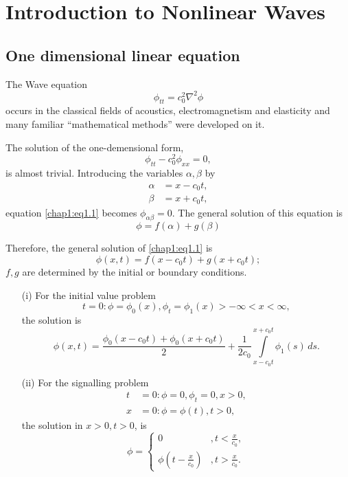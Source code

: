 
\chapter{Introduction to Nonlinear Waves}\label{chap1}

\section{One dimensional linear equation}\pageoriginale\label{chap1:sec1.1}

The Wave equation
$$
\phi_{tt}=c_0^2 \nabla^2\phi
$$
occurs in the classical fields of acoustics, electromagnetism and elasticity and many familiar ``mathematical methods'' were developed on it. 

The solution of the one-demensional form,
\begin{equation}
\phi_{tt}-c_0^2\phi_{xx}=0,\tag{1.1}\label{chap1:eq1.1}
\end{equation}
is almost trivial. Introducing the variables $\alpha,\beta$ by 
\begin{align*}
\alpha &= x-c_0t,\\
\beta &= x+c_0t,
\end{align*}
equation \eqref{chap1:eq1.1} becomes $\phi_{\alpha\beta}=0$. The general solution of this equation is 
$$
\phi=f(\alpha)+g(\beta)
$$

Therefore, the general solution of \eqref{chap1:eq1.1} is 
\begin{equation}
\phi(x,t)=f(x-c_0t)+g(x+c_0t);\tag{1.2}\label{chap1:eq1.2}
\end{equation}
$f,g$ are determined by the initial or boundary conditions.
\begin{itemize}
\item [(i)] For the initial value problem
$$
t=0:\phi=\phi_0(x), \phi_t=\phi_1(x)>-\infty <x<\infty,
$$
the solution is 
\begin{equation}
\phi(x,t)=\frac{\phi_0(x-c_0t)+\phi_0(x+c_0t)}{2}+\frac{1}{2c_0}\int\limits_{x-c_0t}^{x+c_0t}\phi_1(s)\,ds.\tag{1.3}\label{chap1:eq1.3}
\end{equation}\pageoriginale
\item [(ii)] For the signalling problem 
\begin{align*}
t &=0:\phi=0,\phi_t=0,x>0,\\
x&=0:\phi=\phi(t),t>0,
\end{align*}
the solution in $x>0,t>0$, is 
\begin{equation}
\phi=
\begin{cases}
0 & , t<\frac{x}{c_0},\\
\phi\left(t-\frac{x}{c_0}\right) &, t>\frac{x}{c_0}. \tag{1.4}\label{chap1:eq1.4}
\end{cases}
\end{equation}
\end{itemize}


